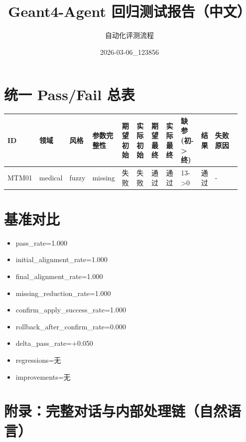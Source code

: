\documentclass[11pt]{ctexart}
\title{Geant4-Agent 回归测试报告（中文）}
\author{自动化评测流程}
\date{2026-03-06\_123856}
\begin{document}
\maketitle
\section{统一 Pass/Fail 总表}
\begin{longtable}{p{0.06\linewidth}p{0.08\linewidth}p{0.07\linewidth}p{0.08\linewidth}p{0.07\linewidth}p{0.07\linewidth}p{0.07\linewidth}p{0.07\linewidth}p{0.09\linewidth}p{0.06\linewidth}p{0.21\linewidth}}
\toprule
ID & 领域 & 风格 & 参数完整性 & 期望初始 & 实际初始 & 期望最终 & 实际最终 & 缺参(初->终) & 结果 & 失败原因 \\
\midrule
MTM01 & medical & fuzzy & missing & 失败 & 失败 & 通过 & 通过 & 13->0 & 通过 & - \\
\bottomrule
\end{longtable}
\section{基准对比}
\begin{itemize}
\item pass\_rate=1.000
\item initial\_alignment\_rate=1.000
\item final\_alignment\_rate=1.000
\item missing\_reduction\_rate=1.000
\item confirm\_apply\_success\_rate=1.000
\item rollback\_after\_confirm\_rate=0.000
\item delta\_pass\_rate=+0.050
\item regressions=无
\item improvements=无
\end{itemize}
\appendix
\section{附录：完整对话与内部处理链（自然语言）}
\end{document}
